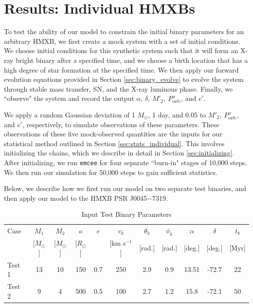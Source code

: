 \documentclass[12pt, preprint]{aastex}
\newcommand{\Msun}{\ifmmode {M_{\odot}}\else${M_{\odot}}$\fi}
\begin{document}
\section{Results: Individual HMXBs} \label{sec:results_individual}

To test the ability of our model to constrain the initial binary parameters for an arbitrary HMXB, we first create a mock system with a set of initial conditions. We choose initial conditions for this synthetic system such that it will form an X-ray bright binary after a specified time, and we choose a birth location that has a high degree of star formation at the specified time. We then apply our forward evolution equations provided in Section \ref{sec:binary_evolve} to evolve the system through stable mass transfer, SN, and the X-ray luminous phase. Finally, we ``observe" the system and record the output $\alpha$, $\delta$, $M'_2$, $P'_{\rm orb}$, and $e'$. 

We apply a random Gaussian deviation of 1 \Msun, 1 day, and 0.05 to $M'_2$, $P'_{\rm orb}$, and $e'$, respectively, to simulate observations of these parameters. These observations of these five mock-observed quantities are the inputs for our statistical method outlined in Section \ref{sec:stats_individual}. This involves initializing the chains, which we describe in detail in Section \ref{sec:initializing}. After initializing, we run {\tt emcee} for four separate ``burn-in" stages of 10,000 steps. We then run our simulation for 50,000 steps to gain sufficient statistics. 

Below, we describe how we first run our model on two separate test binaries, and then apply our model to the HMXB PSR J0045$-$7319.


\begin{table}
\label{tab:mock_data}
\begin{center}
\caption{Input Test Binary Parameters}
\begin{tabular}{lcccccccccc} 
\toprule
Case & $M_1$ & $M_2$ & $a$ & $e$ & $v_k$ & $\theta_k$ & $\phi_k$ & $\alpha$ & $\delta$ & $t_b$ \\
 & [$M_{\odot}$] & [$M_{\odot}$] & [$R_{\odot}$] & & [km s$^{-1}$] & [rad.] & [rad.] & [deg.] & [deg.] & [Myr] \\ 
\midrule
Test 1 & 13 & 10 & 150 & 0.7 & 250 & 2.9 & 0.9 & 13.51 & -72.7 & 22 \\
Test 2 & 9 & 4 & 500 & 0.5 & 100 & 2.7 & 1.2 & 15.8 & -72.1 & 50 \\
\bottomrule
\end{tabular}
\end{center}
\end{table}
\end{document}
